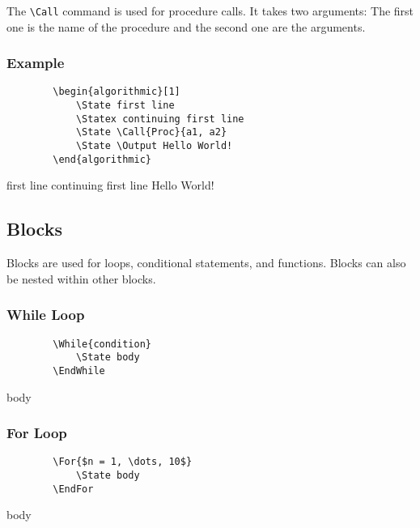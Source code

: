 \documentclass[11pt,a4paper,USenglish]{article}
\begin{document}
The \verb|\Call| command is used for procedure calls. It takes two arguments: The first one is the name of the procedure and the second one are the arguments.

\subsubsection*{Example}
\begin{minipage}[t]{0.45\textwidth}
	\begin{verbatim}
		\begin{algorithmic}[1]
		    \State first line
		    \Statex continuing first line
		    \State \Call{Proc}{a1, a2}
		    \State \Output Hello World!
		\end{algorithmic}
	\end{verbatim}
\end{minipage}
\hfill
\begin{minipage}[t]{0.45\textwidth}
	\begin{algorithmic}[1]
		\State first line
		\Statex continuing first line
		\State {}
		\State \Output Hello World!
	\end{algorithmic}
\end{minipage}


\subsection{Blocks}
Blocks are used for loops, conditional statements, and functions. Blocks can also be nested within other blocks.

\subsubsection{While Loop}
\begin{minipage}[t]{0.45\textwidth}
	\begin{verbatim}
		\While{condition}
		    \State body
		\EndWhile
	\end{verbatim}
\end{minipage}
\hfill
\begin{minipage}[t]{0.45\textwidth}
	\begin{algorithmic}
		    \State body
		\EndWhile
	\end{algorithmic}
\end{minipage}


\subsubsection{For Loop}
\begin{minipage}[t]{0.45\textwidth}
	\begin{verbatim}
		\For{$n = 1, \dots, 10$}
		    \State body
		\EndFor
	\end{verbatim}
\end{minipage}
\hfill
\begin{minipage}[t]{0.45\textwidth}
	\begin{algorithmic}
		\For{$n = 1, \dots, 10$}
		    \State body
		\EndFor
	\end{algorithmic}
\end{minipage}
\end{document}
